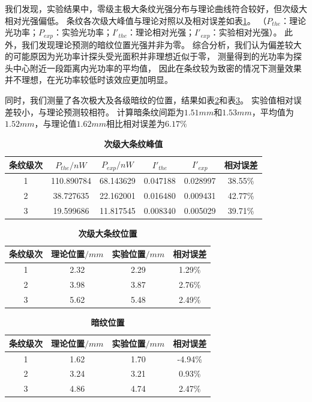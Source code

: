 \documentclass[12pt,a4paper,UTF8]{ctexart}
\begin{document}
我们发现，实验结果中，零级主极大条纹光强分布与理论曲线符合较好，但次级大相对光强偏低。
条纹各次级大峰值与理论对照以及相对误差如表\ref{tab:1.1}。
（$P_{the}$：理论光功率；$P_{exp}$：实验光功率；$I'_{the}$：理论相对光强；$I'_{exp}$：实验相对光强）。
此外，我们发现理论预测的暗纹位置光强并非为零。
综合分析，我们认为偏差较大的可能原因为光功率计探头受光面积并非理想近似于零，
测量得到的光功率为探头中心附近一段距离内光功率的平均值，
因此在条纹较为致密的情况下测量效果并不理想，在光功率较低时该效应更加明显。

同时，我们测量了各次极大及各级暗纹的位置，结果如表\ref{tab:1.2}和表\ref{tab:1.3}。
实验值相对误差较小，与理论预测较相符。
计算暗条纹间距为$1.51mm$和$1.53mm$，平均值为$1.52mm$，与理论值$1.62mm$相比相对误差为$6.17\%$

\begin{table}[htbp]
	\centering
	\begin{tabular}{cccccc}
	\toprule
	条纹级次 &$P_{the}/nW$ &$P_{exp}/nW$ &$I'_{the}$ &$I'_{exp}$ &相对误差 \\
	\midrule
	1 &110.890784 &68.143629 &0.047188 &0.028997 &38.55\% \\
	2  &38.727635 &22.162001 &0.016480 &0.009431 &42.77\% \\
	3  &19.599686 &11.817545  &0.008340 &0.005029 &39.71\% \\
	\bottomrule
    \end{tabular}
	\caption{\textbf{次级大条纹峰值}}
	\label{tab:1.1}
\end{table}

\begin{table}[htbp]
	\centering
		\begin{tabular}{cccc}
			\toprule
			条纹级次	&理论位置$/mm$	&实验位置$/mm$	&相对误差 \\
			\midrule
			1  &2.32  &2.29  &1.29\% \\
			2  &3.98  &3.87  &2.76\% \\
			3  &5.62  &5.48  &2.49\% \\	
			\bottomrule
		\end{tabular}
		\caption{\textbf{次级大条纹位置}}
		\label{tab:1.2}
\end{table}

\begin{table}[htbp]
    \centering
		\begin{tabular}{cccc}
			\toprule
			条纹级次	&理论位置$/mm$	&实验位置$/mm$	&相对误差 \\
			\midrule
			1  &1.62  &1.70  &-4.94\% \\
			2  &3.24  &3.21   &0.93\% \\
			3  &4.86  &4.74   &2.47\% \\	
			\bottomrule
		\end{tabular}
		\caption{\textbf{暗纹位置}}
		\label{tab:1.3}
\end{table}
\end{document}
